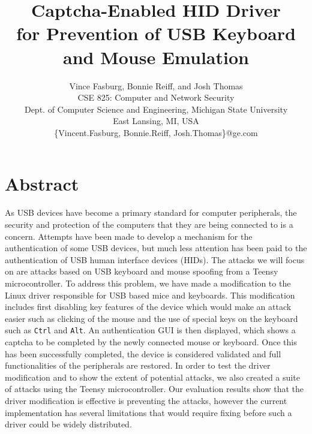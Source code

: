 \documentclass[pagenumbers]{ieee}
\begin{document}
\title{Captcha-Enabled HID Driver \\ for Prevention of USB Keyboard and Mouse Emulation\\}

\author{Vince Fasburg, Bonnie Reiff, and Josh Thomas\\
CSE 825: Computer and Network Security\\
Dept. of Computer Science and Engineering, Michigan State University\\
East Lansing, MI, USA\\
\{Vincent.Fasburg, Bonnie.Reiff, Josh.Thomas\}@ge.com\\
}

\maketitle
\thispagestyle{empty}


\section{Abstract}
\label{section:abstract}

As USB devices have become a primary standard for computer peripherals, the security and protection of the computers that they are being connected to is a concern. Attempts have been made to develop a mechanism for the authentication of some USB devices, but much less attention has been paid to the authentication of USB human interface devices (HIDs). The attacks we will focus on are attacks based on USB keyboard and mouse spoofing from a Teensy microcontroller. To address this problem, we have made a modification to the Linux driver responsible for USB based mice and keyboards.  This modification includes first disabling key features of the device which would make an attack easier such as clicking of the mouse and the use of special keys on the keyboard such as \texttt{Ctrl} and \texttt{Alt}. An authentication GUI is then displayed, which shows a captcha to be completed by the newly connected mouse or keyboard. Once this has been successfully completed, the device is considered validated and full functionalities of the peripherals are restored. In order to test the driver modification and to show the extent of potential attacks, we also created a suite of attacks using the Teensy microcontroller. Our evaluation results show that the driver modification is effective is preventing the attacks, however the current implementation has several limitations that would require fixing before such a driver could be widely distributed.
\end{document}
